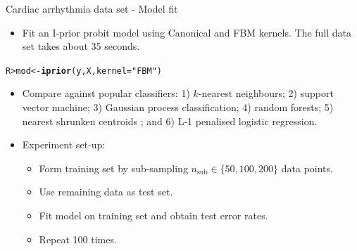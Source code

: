 \documentclass{beamer}\usepackage[]{graphicx}\usepackage[]{color}
\makeatletter
\newcommand{\hlstr}[1]{\textcolor[rgb]{0.192,0.494,0.8}{#1}}%
\newcommand{\hlstd}[1]{\textcolor[rgb]{0.345,0.345,0.345}{#1}}%
\newcommand{\hlkwb}[1]{\textcolor[rgb]{0.69,0.353,0.396}{#1}}%
\newcommand{\hlkwc}[1]{\textcolor[rgb]{0.333,0.667,0.333}{#1}}%
\newcommand{\hlkwd}[1]{\textcolor[rgb]{0.737,0.353,0.396}{\textbf{#1}}}%
\newenvironment{kframe}{%
 \def\at@end@of@kframe{}%
 \ifinner\ifhmode%
  \def\at@end@of@kframe{\end{minipage}}%
  \begin{minipage}{\columnwidth}%
 \fi\fi%
 \def\FrameCommand##1{\hskip\@totalleftmargin \hskip-\fboxsep
 \colorbox{shadecolor}{##1}\hskip-\fboxsep
     \hskip-\linewidth \hskip-\@totalleftmargin \hskip\columnwidth}%
 \MakeFramed {\advance\hsize-\width
   \@totalleftmargin\z@ \linewidth\hsize
   \@setminipage}}%
 {\par\unskip\endMakeFramed%
 \at@end@of@kframe}
\newenvironment{knitrout}{}{} %
\makeatother
\begin{document}
\begin{frame}[fragile]{Cardiac arrhythmia data set - Model fit}
\vspace{-20pt}
\begin{itemize}
  \item Fit an I-prior probit model using Canonical and FBM kernels. The full data set takes about 35 seconds.
\end{itemize}
\vspace{-5pt}
\begin{knitrout}\small
{}\color{fgcolor}\begin{kframe}
\begin{alltt}
\hlstd{R> }\hlstd{mod} \hlkwb{<-} \hlkwd{iprior}\hlstd{(y, X,} \hlkwc{kernel} \hlstd{=} \hlstr{"FBM"}\hlstd{)}
\end{alltt}
\end{kframe}
\end{knitrout}
\vspace{-10pt}
\begin{itemize}
  \item Compare against popular classifiers: 1) $k$-nearest neighbours; 2) support vector machine; 3) Gaussian process classification; 4) random forests; 5) nearest shrunken centroids \parencite{tibshirani2003class}; and 6) L-1 penalised logistic regression.
  \vspace{0.5em}
  \item Experiment set-up:
  \begin{itemize}
    \item Form training set by sub-sampling $n_{\text{sub}} \in \{50, 100, 200 \}$ data points.
    \item Use remaining data as test set.
    \item Fit model on training set and obtain test error rates.
    \item Repeat 100 times.
  \end{itemize}
\end{itemize}

\end{frame}
\end{document}
